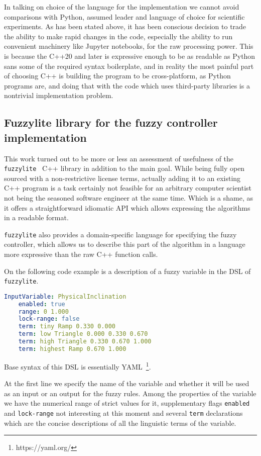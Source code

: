 \documentclass[12pt, a4paper]{article}
\begin{document}
	In talking on choice of the language for the implementation we cannot avoid comparisons with Python, assumed leader and language of choice for scientific experiments.
	As has been stated above, it has been conscious decision to trade the ability to make rapid changes in the code, especially the ability to run convenient machinery like Jupyter notebooks, for the raw processing power.
	This is because the C++20 and later is expressive enough to be as readable as Python sans some of the required syntax boilerplate, and in reality the most painful part of choosing C++ is building the program to be cross-platform, as Python programs are, and doing that with the code which uses third-party libraries is a nontrivial implementation problem.

	\subsection{Fuzzylite library for the fuzzy controller implementation}\label{fuzzy-implementation}

	This work turned out to be more or less an assessment of usefulness of the \texttt{fuzzylite}~\cite{fl::fuzzylite} C++ library in addition to the main goal.
	While being fully open sourced with a non-restrictive license terms, actually adding it to an existing C++ program is a task certainly not feasible for an arbitrary computer scientist not being the seasoned software engineer at the same time.
	Which is a shame, as it offers a straightforward idiomatic API which allows expressing the algorithms in a readable format.

	\texttt{fuzzylite} also provides a domain-specific language for specifying the fuzzy controller, which allows us to describe this part of the algorithm in a language more expressive than the raw C++ function calls.

  On the following code example is a description of a fuzzy variable in the DSL of \texttt{fuzzylite}.

  \begin{lstlisting}[language=yaml]
  InputVariable: PhysicalInclination
    enabled: true
    range: 0 1.000
    lock-range: false
    term: tiny Ramp 0.330 0.000
    term: low Triangle 0.000 0.330 0.670
    term: high Triangle 0.330 0.670 1.000
    term: highest Ramp 0.670 1.000
  \end{lstlisting}

  Base syntax of this DSL is essentially YAML~\footnote{https://yaml.org/}.

  At the first line we specify the name of the variable and whether it will be used as an input or an output for the fuzzy rules.
  Among the properties of the variable we have the numerical range of strict values for it, supplementary flags \texttt{enabled} and \texttt{lock-range} not interesting at this moment
  and several \texttt{term} declarations which are the concise descriptions of all the linguistic terms of the variable.
\end{document}
